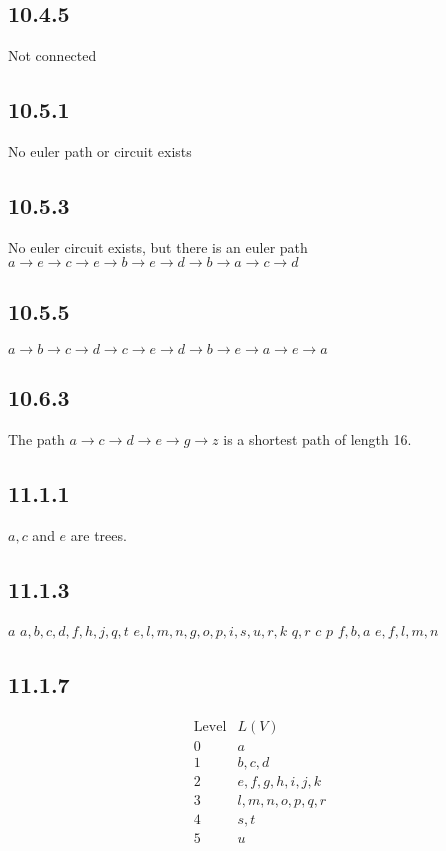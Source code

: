 \documentclass[12pt,titlepage]{extarticle}
\begin{document}
\subsection*{10.4.5}
Not connected

\subsection*{10.5.1}
No euler path or circuit exists

\subsection*{10.5.3}
No euler circuit exists, but there is an euler path $a \to e \to c \to e \to b \to e \to d \to b \to a \to c \to d$

\subsection*{10.5.5}
$a \to b \to c \to d \to c \to e \to d \to b \to e \to a \to e \to a$

\subsection*{10.6.3}
The path $a \to c \to d \to e \to g \to z$ is a shortest path of length 16.

\subsection*{11.1.1}
$a,c$ and $e$ are trees.

\subsection*{11.1.3}
\begin{tasks}
    \task $a$
    \task $a,b,c,d,f,h,j,q,t$
    \task $e,l,m,n,g,o,p,i,s,u,r,k$
    \task $q,r$
    \task $c$
    \task $p$
    \task $f,b,a$
    \task $e,f,l,m,n$
\end{tasks}

\subsection*{11.1.7}
\[
    \begin{array}{c|l}
        \text{Level} & L(V) \\\hline
        0 & a \\
        1 & b,c,d \\
        2 & e,f,g,h,i,j,k \\
        3 & l,m,n,o,p,q,r \\
        4 & s,t \\
        5 & u
    \end{array}
\]
\end{document}
